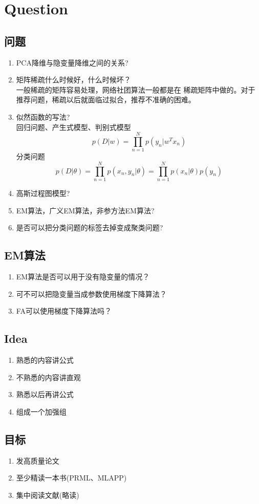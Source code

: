 \chapter{Question}
\section{问题}

\begin{enumerate}
\item PCA降维与隐变量降维之间的关系?\\
\item 矩阵稀疏什么时候好，什么时候坏？\\
一般稀疏的矩阵容易处理，网络社团算法一般都是在
稀疏矩阵中做的。对于推荐问题，稀疏以后就面临过拟合，推荐不准确的困难。
\item 似然函数的写法?\\
回归问题、产生式模型、判别式模型
\begin{equation}
p(D|w) = \prod^N_{n=1} p(y_n|w^Tx_n)
\end{equation}
分类问题
\begin{equation}
p(D|\theta) = \prod_{n=1}^N p(x_n, y_n|\theta)
= \prod_{n=1}^Np(x_n|\theta)p(y_n)
\end{equation}
\item 高斯过程图模型?
\item EM算法，广义EM算法，非参方法EM算法?
\item 是否可以把分类问题的标签去掉变成聚类问题?
\end{enumerate}

\section{EM算法}
\begin{enumerate}
\item EM算法是否可以用于没有隐变量的情况？
\item 可不可以把隐变量当成参数使用梯度下降算法？
\item FA可以使用梯度下降算法吗？
\end{enumerate}
\section{Idea}
\begin{enumerate}
\item 熟悉的内容讲公式
\item 不熟悉的内容讲直观
\item 熟悉以后再讲公式
\item 组成一个加强组 
\end{enumerate}

\section{目标}
\begin{enumerate}
\item 发高质量论文
\item 至少精读一本书(PRML、MLAPP)
\item 集中阅读文献(略读)
\end{enumerate}

